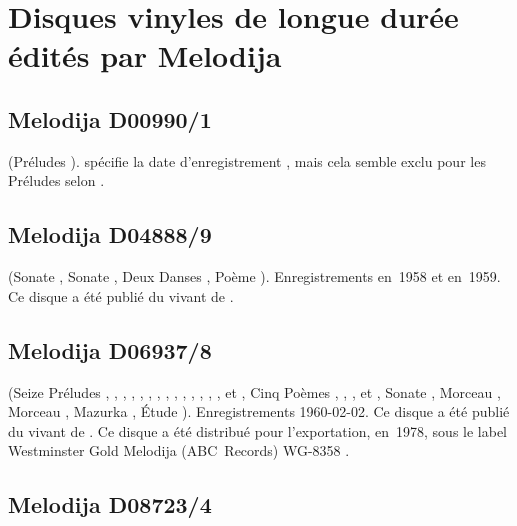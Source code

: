 \section{Disques vinyles de longue durée édités par Melodija}

\subsection{Melodija D00990/1}

\Chopin{} (Préludes ).
\EWhite{} \citep[voir][p.~83]{White} spécifie la date d'enregistrement
, mais cela semble exclu pour les Préludes 
selon \FMalik{} \citep[voir][p.~66]{Malik}.

\subsection{Melodija D04888/9}

\Scriabine{} (Sonate , Sonate , Deux Danses ,
Poème ).
Enregistrements en~1958 et en~1959.
Ce disque a été publié du vivant de \VSofronitsky{}.

\subsection{Melodija D06937/8}

\Scriabine{} (Seize Préludes  ,  ,
 ,  ,  , 
,  ,  , 
,  ,  , 
,  ,  , 
 et  , Cinq Poèmes  ,
 ,  ,   et
, Sonate , Morceau  , Morceau 
, Mazurka  , Étude  ).
Enregistrements 1960-02-02.
Ce disque a été publié du vivant de \VSofronitsky{}.
Ce disque a été distribué pour l'exportation, en~1978, sous le label
Westminster Gold Melodija (ABC~Records) WG-8358 \citep[voir][p.~83]{White}.

\subsection{Melodija D08723/4}

